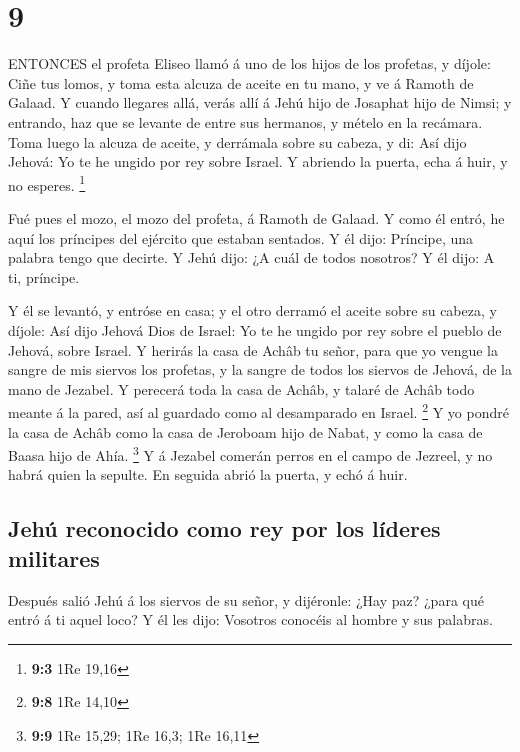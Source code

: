 \hypertarget{section-8}{%
\section{9}\label{section-8}}

 ENTONCES el profeta Eliseo llamó á uno de los hijos de los
profetas, y díjole: Ciñe tus lomos, y toma esta alcuza de aceite en tu
mano, y ve á Ramoth de Galaad.  Y cuando llegares allá,
verás allí á Jehú hijo de Josaphat hijo de Nimsi; y entrando, haz que se
levante de entre sus hermanos, y mételo en la recámara. 
Toma luego la alcuza de aceite, y derrámala sobre su cabeza, y di: Así
dijo Jehová: Yo te he ungido por rey sobre Israel. Y abriendo la puerta,
echa á huir, y no esperes. \footnote{\textbf{9:3} 1Re 19,16}

 Fué pues el mozo, el mozo del profeta, á Ramoth de Galaad.
 Y como él entró, he aquí los príncipes del ejército que
estaban sentados. Y él dijo: Príncipe, una palabra tengo que decirte. Y
Jehú dijo: ¿A cuál de todos nosotros? Y él dijo: A ti, príncipe.

 Y él se levantó, y entróse en casa; y el otro derramó el
aceite sobre su cabeza, y díjole: Así dijo Jehová Dios de Israel: Yo te
he ungido por rey sobre el pueblo de Jehová, sobre Israel. 
Y herirás la casa de Achâb tu señor, para que yo vengue la sangre de mis
siervos los profetas, y la sangre de todos los siervos de Jehová, de la
mano de Jezabel.  Y perecerá toda la casa de Achâb, y talaré
de Achâb todo meante á la pared, así al guardado como al desamparado en
Israel. \footnote{\textbf{9:8} 1Re 14,10}  Y yo pondré la
casa de Achâb como la casa de Jeroboam hijo de Nabat, y como la casa de
Baasa hijo de Ahía. \footnote{\textbf{9:9} 1Re 15,29; 1Re 16,3; 1Re
  16,11}  Y á Jezabel comerán perros en el campo de
Jezreel, y no habrá quien la sepulte. En seguida abrió la puerta, y echó
á huir.

\hypertarget{jehuxfa-reconocido-como-rey-por-los-luxedderes-militares}{%
\subsection{Jehú reconocido como rey por los líderes
militares}\label{jehuxfa-reconocido-como-rey-por-los-luxedderes-militares}}

 Después salió Jehú á los siervos de su señor, y dijéronle:
¿Hay paz? ¿para qué entró á ti aquel loco? Y él les dijo: Vosotros
conocéis al hombre y sus palabras.

